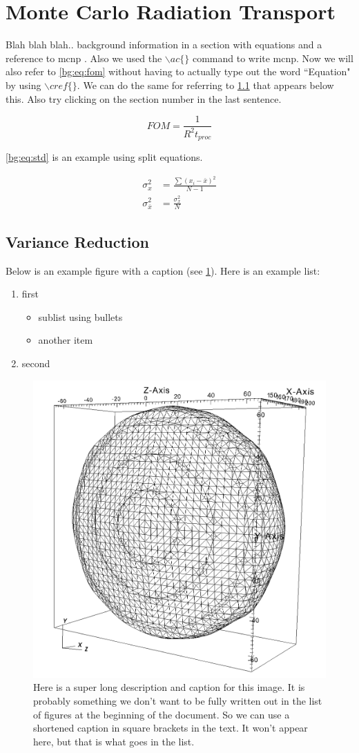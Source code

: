 \section{Monte Carlo Radiation Transport}
\label{sec:bg:mc}

Blah blah blah.. background information in a section with equations and a reference to \ac{mcnp} \cite{mcnp5-theory}.
Also we used the $\backslash ac \{ \}$ command to write \ac{mcnp}.
Now we will also refer to \cref{bg:eq:fom} without having to actually type out the word ``Equation" by using $\backslash cref \{ \}$.
We can do the same for referring to \cref{sec:bg:vr} that appears below this.
Also try clicking on the section number in the last sentence.

\begin{equation}\label{bg:eq:fom}
	FOM = \frac{1}{R^2 t_{proc}}
\end{equation}

\cref{bg:eq:std} is an example using split equations.

\begin{equation}\label{bg:eq:std}
\begin{split}
	\sigma_x^2 &= \frac{\sum \left(x_i - \bar{x}\right)^2}{N-1} \\
	\sigma_{\bar{x}}^2 &= \frac{\sigma_x^2}{N}
\end{split}
\end{equation}

\subsection{Variance Reduction}
\label{sec:bg:vr}

Below is an example figure with a caption (see \cref{fig:bg:example-fig}).
Here is an example list:
\begin{enumerate}
	\item first
		\begin{itemize}
			\item sublist using bullets
			\item another item
		\end{itemize}
	\item second
\end{enumerate}

\begin{figure}[h!]
\centering
	\includegraphics[width=.3\textwidth]{./content/background/example-isosurf.png}
	\caption[Example short figure caption]{Here is a super long description and caption for this image. It is probably something we don't want to be fully written out in the list of figures at the beginning of the document. So we can use a shortened caption in square brackets in the text. It won't appear here, but that is what goes in the list.
	\label{fig:bg:example-fig}}
\end{figure}

